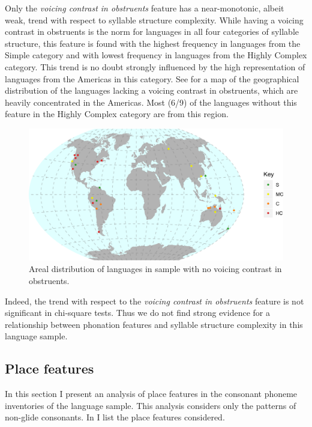   Only the \textit{voicing contrast in obstruents} feature has a near-monotonic, albeit weak, trend with respect to syllable structure complexity. While having a voicing contrast in obstruents is the norm for languages in all four categories of syllable structure, this feature is found with the highest frequency in languages from the Simple category and with lowest frequency in languages from the Highly Complex category. This trend is no doubt strongly influenced by the high representation of languages from the Americas in this category. See  for a map of the geographical distribution of the languages lacking a voicing contrast in obstruents, which are heavily concentrated in the Americas. Most (6/9) of the languages without this feature in the Highly Complex category are from this region.

  
\begin{figure}
\includegraphics[width=\textwidth]{figures/fig46.png}
\caption{\label{fig:4.6}Areal distribution of languages in sample with no voicing contrast in obstruents.}
\end{figure}

  Indeed, the trend with respect to the \textit{voicing contrast in obstruents} feature is not significant in chi-square tests. Thus we do not find strong evidence for a relationship between phonation features and syllable structure complexity in this language sample.

\subsection{Place features}\label{sec:4.4.4}

  In this section I present an analysis of place features in the consonant phoneme inventories of the language sample. This analysis considers only the patterns of non-glide consonants. In  I list the place features considered.

